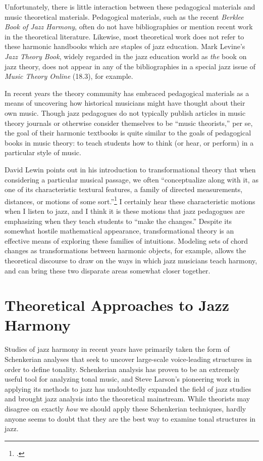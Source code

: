 \documentclass[diss]{subfiles}
\begin{document}
Unfortunately, there is little interaction between these pedagogical materials
and music theoretical materials. Pedagogical materials, such as the recent
\emph{Berklee Book of Jazz Harmony}\nocite{berklee:harmony}, often do not have
bibliographies or mention recent work in the theoretical literature.
Likewise, most theoretical work does not refer to these harmonic handbooks
which are staples of jazz education. Mark Levine’s \emph{Jazz Theory
Book}\nocite{levine:1995}, widely regarded in the jazz education world as
\emph{the} book on jazz theory, does not appear in any of the bibliographies
in a special jazz issue of \emph{Music Theory Online} (18.3), for
example.

In recent years the theory community has embraced pedagogical materials as a
means of uncovering how historical musicians might have thought about their
own music. Though jazz pedagogues do not typically publish articles
in music theory journals or otherwise consider themselves to be “music
theorists,” per se, the goal of their harmonic textbooks is quite similar to
the goals of pedagogical books in music theory: to teach students how to think
(or hear, or perform) in a particular style of music.

David Lewin points out in his introduction to transformational theory that
when considering a particular musical passage, we often “conceptualize along
with it, as one of its characteristic textural features, a family of directed
measurements, distances, or motions of some sort.”\footcite[16]{lewin:gmit} I
certainly hear these characteristic motions when I listen to jazz, and I think
it is these motions that jazz pedagogues are emphasizing when they
teach students to “make the changes.” Despite its somewhat hostile
mathematical appearance, transformational theory is an effective means of
exploring these families of intuitions. Modeling sets of chord changes as
transformations between harmonic objects, for example, allows the theoretical
discourse to draw on the ways in which jazz musicians teach harmony, and can
bring these two disparate areas somewhat closer together.


\section{Theoretical Approaches to Jazz Harmony}
\label{sec:theoretical-approaches} %

Studies of jazz harmony in recent years have primarily taken the form of
Schenkerian analyses that seek to uncover large-scale voice-leading structures
in order to define tonality. Schenkerian analysis has proven to be an
extremely useful tool for analyzing tonal music, and Steve Larson’s pioneering
work in applying its methods to jazz has undoubtedly expanded the field of
jazz studies and brought jazz analysis into the theoretical mainstream. While
theorists may disagree on exactly \emph{how} we should apply these Schenkerian
techniques, hardly anyone seems to doubt that they are the best way to examine
tonal structures in jazz.
\end{document}
